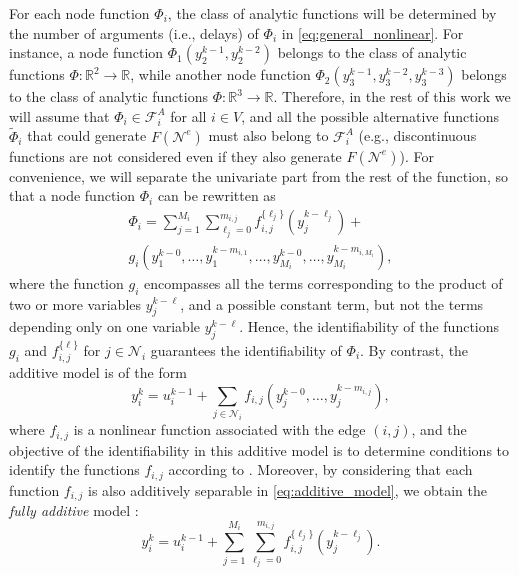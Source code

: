 \documentclass[letterpaper,10pt,journal]{IEEEtran}
\newcommand{\F}{\mathcal{F}}
\newcommand{\Fone}{\mathcal{F}^A}
\newcommand{\R}{\mathbb R}
\newcommand{\NN}{\mathcal{N}}
\begin{document}
For each node function $\Phi_i$, the class of analytic functions will be determined by the number of arguments (i.e., delays) of $\Phi_i$ in \eqref{eq:general_nonlinear}. For instance, a node function $\Phi_1(y_2^{k-1},y_2^{k-2})$ belongs to the class of analytic functions $\Phi:\R^2\to\R$, while another node function $\Phi_2(y_3^{k-1},y_3^{k-2},y_3^{k-3})$ belongs to the class of analytic functions $\Phi:\R^3\to\R$. 
Therefore, in the rest of this work we will assume that $\Phi_i\in\Fone_i$ for all $i \in V$, and all the possible alternative functions $\tilde \Phi_i$ that could generate $F(\NN^e)$ must also belong to $\F^A_i$ (e.g., discontinuous functions are not considered even if they also generate $F(\NN^e)$).
For convenience, we will separate the univariate part from the rest of the function, so that a node function $\Phi_i$ can be rewritten as
\begin{multline}\label{eq:decomposition_Fi}
    \Phi_i=\sum_{j=1}^{M_i}\sum_{\ell_j=0}^{m_{i,j}} f_{i,j}^{\{\ell_j\}}(y_j^{k-\ell_j})+\\
    \!g_i(y_1^{k-0},\ldots,y_1^{k-m_{i,1}},\ldots,y_{M_i}^{k-0},\ldots,y_{M_i}^{k-m_{i,M_i}}),
\end{multline}
where the function $g_i$ encompasses all the terms corresponding to the product of two or more variables $y_j^{k-\ell}$, and a possible constant term, but not the terms depending only on one variable $y_j^{k-\ell}$. 
Hence, the identifiability of the functions $g_i$ and $f_{i,j}^{\{\ell\}}$ for $j\in\NN_i$ guarantees the identifiability of $\Phi_i$. By contrast, the additive model is of the form \cite{vizuete2023nonlinear,vizuete2026nonlinear}
\begin{equation}\label{eq:additive_model}
    y_i^k=u_i^{k-1}+\sum_{j\in \mathcal{N}_i}f_{i,j}(y_j^{k-0},\ldots,y_j^{k-{m_{i,j}}}),   
\end{equation}
\hspace{-3mm} where $f_{i,j}$ is a nonlinear function associated with the edge $(i,j)$, and the objective of the identifiability in this additive model is to determine conditions to identify the functions $f_{i,j}$ according to \cite[Definition 2]{vizuete2026nonlinear}. Moreover, 
by considering that each function $f_{i,j}$ is also additively separable in \eqref{eq:additive_model}, we obtain the \emph{fully additive} model \cite{vizuete2026nonlinear}: 
\begin{equation}\label{eq:fully_additive_model}
    y_i^k=u_i^{k-1}+\sum_{j=1}^{M_i}\sum_{\ell_j=0}^{m_{i,j}} f_{i,j}^{\{\ell_j\}}(y_j^{k-\ell_j}).   
\end{equation}
\end{document}
